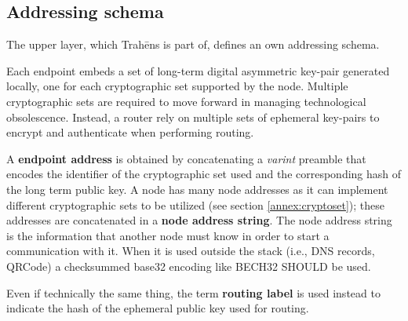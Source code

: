 \documentclass[12pt,oneside]{wlscirep}
\newcommand{\ProtoName}{Trah\={e}ns }
\begin{document}
\subsection{Addressing schema}
The upper layer, which \ProtoName is part of, defines an own addressing schema. \par
Each endpoint embeds a set of long-term digital asymmetric key-pair generated locally, one for each cryptographic set supported by the node. Multiple cryptographic sets are required to move forward in managing technological obsolescence. Instead, a router rely on multiple sets of ephemeral key-pairs to encrypt and authenticate when performing routing. \par
A \textbf{endpoint address} is obtained by concatenating a \textit{varint} preamble that encodes the identifier of the cryptographic set used and the corresponding hash of the long term public key. A node has many node addresses as it can implement different cryptographic sets to be utilized (see section \ref{annex:cryptoset}); these addresses are concatenated in a \textbf{node address string}. The node address string is the information that another node must know in order to start a communication with it. When it is used outside the stack (i.e., DNS records, QRCode) a checksummed base32 encoding like BECH32\cite{BECH32} SHOULD be used.\par
Even if technically the same thing, the term \textbf{routing label} is used instead to indicate the hash of the ephemeral public key used for routing.\par
\end{document}

